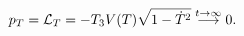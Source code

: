 \begin{equation}\label{press}
p_{T}={\cal L}_{T}=-T_{3}V(T)\sqrt{1-\dot{T}^{2}}
\stackrel{t\rightarrow\infty}{\longrightarrow}0.
\end{equation}

